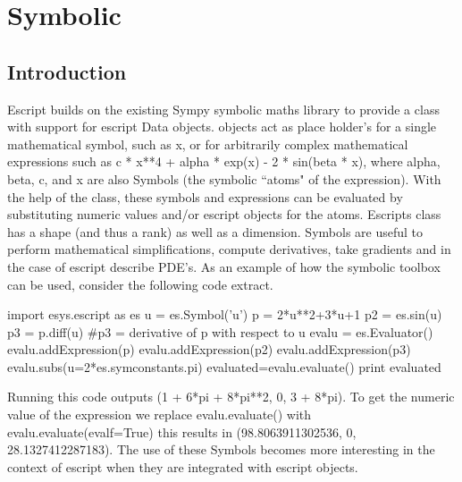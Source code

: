 \chapter{Symbolic}
\label{CHAP: The escript symbolic toolbox}
\section{Introduction}
Escript builds on the existing Sympy\cite{Sympy} symbolic maths library to provide a \SYMBOL class with support for escript Data objects. \SYMBOL objects act as place holder's for a single mathematical symbol, 
such as x, or for arbitrarily complex mathematical expressions such as
c * x**4 + alpha * exp(x) - 2 * sin(beta * x), where alpha, beta, c, and x
are also Symbols (the symbolic ``atoms" of the expression).
With the help of the \EVALUATOR class, these symbols and expressions can
be evaluated by substituting numeric values and/or escript \Data objects
for the atoms. Escripts \SYMBOL class has a
shape (and thus a rank) as well as a dimension.
Symbols are useful to perform mathematical simplifications,
compute derivatives, take gradients and in the case of escript describe PDE's. As an example of how the symbolic toolbox can be used, consider the following code extract.
\begin{python}
import esys.escript as es
u = es.Symbol('u')
p = 2*u**2+3*u+1
p2 = es.sin(u)
p3 = p.diff(u)            #p3 = derivative of p with respect to u
evalu = es.Evaluator()
evalu.addExpression(p)
evalu.addExpression(p2)
evalu.addExpression(p3)
evalu.subs(u=2*es.symconstants.pi)
evaluated=evalu.evaluate()
print evaluated
\end{python}
Running this code outputs (1 + 6*pi + 8*pi**2, 0, 3 + 8*pi).  To get the numeric value of the expression we replace evalu.evaluate() with evalu.evaluate(evalf=True) this results in (98.8063911302536, 0, 28.1327412287183). The use of these Symbols becomes more interesting in the context of escript when they are integrated with escript \Data objects. 
